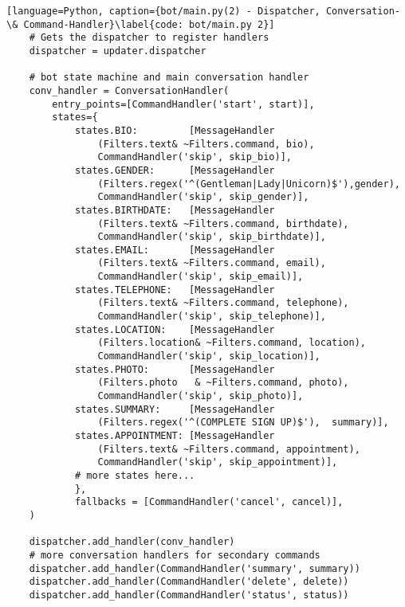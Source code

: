         \begin{lstlisting}[language=Python, caption={bot/main.py(2) - Dispatcher, Conversation- \& Command-Handler}\label{code: bot/main.py 2}]
    # Gets the dispatcher to register handlers
    dispatcher = updater.dispatcher
    
    # bot state machine and main conversation handler
    conv_handler = ConversationHandler(
        entry_points=[CommandHandler('start', start)],
        states={
            states.BIO:         [MessageHandler
                (Filters.text& ~Filters.command, bio), 
                CommandHandler('skip', skip_bio)],
            states.GENDER:      [MessageHandler
                (Filters.regex('^(Gentleman|Lady|Unicorn)$'),gender), 
                CommandHandler('skip', skip_gender)],
            states.BIRTHDATE:   [MessageHandler
                (Filters.text& ~Filters.command, birthdate), 
                CommandHandler('skip', skip_birthdate)],
            states.EMAIL:       [MessageHandler
                (Filters.text& ~Filters.command, email), 
                CommandHandler('skip', skip_email)],
            states.TELEPHONE:   [MessageHandler
                (Filters.text& ~Filters.command, telephone), 
                CommandHandler('skip', skip_telephone)],
            states.LOCATION:    [MessageHandler
                (Filters.location& ~Filters.command, location), 
                CommandHandler('skip', skip_location)],
            states.PHOTO:       [MessageHandler
                (Filters.photo   & ~Filters.command, photo), 
                CommandHandler('skip', skip_photo)],
            states.SUMMARY:     [MessageHandler
                (Filters.regex('^(COMPLETE SIGN UP)$'),  summary)],
            states.APPOINTMENT: [MessageHandler
                (Filters.text& ~Filters.command, appointment), 
                CommandHandler('skip', skip_appointment)],
            # more states here...
            },
            fallbacks = [CommandHandler('cancel', cancel)],
    )

    dispatcher.add_handler(conv_handler)
    # more conversation handlers for secondary commands
    dispatcher.add_handler(CommandHandler('summary', summary))
    dispatcher.add_handler(CommandHandler('delete', delete))
    dispatcher.add_handler(CommandHandler('status', status))
        \end{lstlisting}

